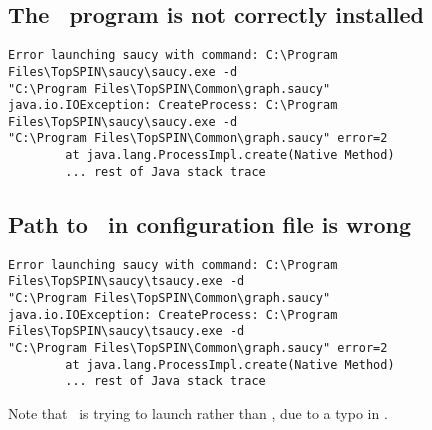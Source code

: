 
\subsection{The \saucy\ program is not correctly installed}


\exampleerrormessage

\begin{lstlisting}
Error launching saucy with command: C:\Program Files\TopSPIN\saucy\saucy.exe -d
"C:\Program Files\TopSPIN\Common\graph.saucy"
java.io.IOException: CreateProcess: C:\Program Files\TopSPIN\saucy\saucy.exe -d
"C:\Program Files\TopSPIN\Common\graph.saucy" error=2
        at java.lang.ProcessImpl.create(Native Method)
        ... rest of Java stack trace
\end{lstlisting}



\subsection{Path to \saucy\ in configuration file is wrong}


\exampleerrormessage

\begin{lstlisting}
Error launching saucy with command: C:\Program Files\TopSPIN\saucy\tsaucy.exe -d
"C:\Program Files\TopSPIN\Common\graph.saucy"
java.io.IOException: CreateProcess: C:\Program Files\TopSPIN\saucy\tsaucy.exe -d
"C:\Program Files\TopSPIN\Common\graph.saucy" error=2
        at java.lang.ProcessImpl.create(Native Method)
        ... rest of Java stack trace
\end{lstlisting}
%
Note that \topspin\ is trying to launch  rather
than \inline{saucy.exe}, due to a typo in \inline{config.txt}.

